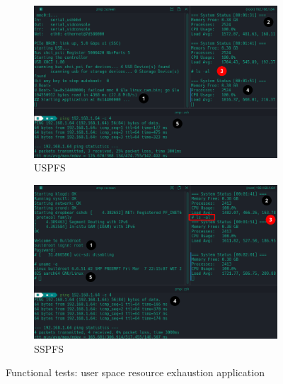 \begin{figure}[!hbt]
  \centering
  \begin{subfigure}[t]{0.7\textwidth}
    \centering
    \includegraphics[width=1.0\textwidth]{./img/png/user-memhog-test-annot} 
    \caption{USPFS}%
    \label{fig:user-memhog-test-uspfs}
  \end{subfigure}
  \begin{subfigure}[t]{0.7\textwidth}
    \centering
    \includegraphics[width=\linewidth]{./img/png/user-memhog-test-bao-annot} %
    \caption{SSPFS}%
    \label{fig:user-memhog-test-sspfs}
  \end{subfigure}
  \caption{Functional tests: user space resource exhaustion application}
  \label{fig:user-memhog-test}
\end{figure}



